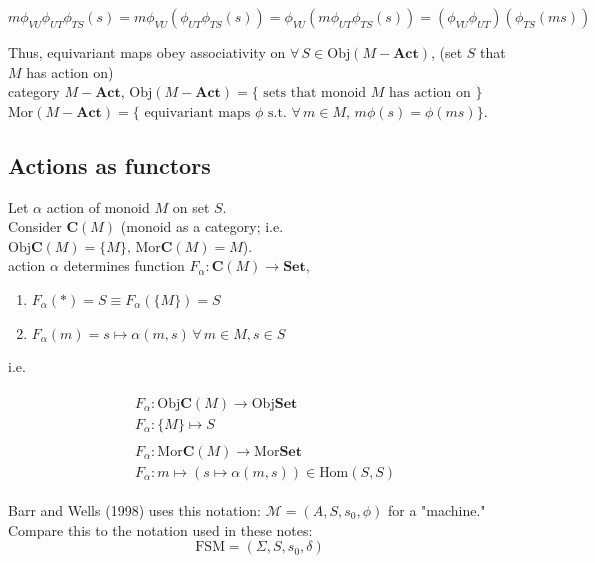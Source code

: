 \[
m \phi_{VU} \phi_{UT} \phi_{TS}(s) = m \phi_{VU} (\phi_{UT} \phi_{TS}(s)) = \phi_{VU} (m \phi_{UT} \phi_{TS}(s)) = (\phi_{VU} \phi_{UT}) (\phi_{TS}(ms))
\]

Thus, equivariant maps obey associativity on $\forall \, S \in \text{Obj}(M-\mathbf{Act})$, (set $S$ that $M$ has action on) \\
category $M-\mathbf{Act}$, $\text{Obj}(M-\mathbf{Act}) = \lbrace \text{ sets that monoid $M$ has action on }\rbrace$ \\
 $\text{Mor}(M-\mathbf{Act}) = \lbrace \text{ equivariant maps $\phi$ s.t. } \forall \, m \in M, \, m\phi(s) = \phi(ms) \rbrace$.

\subsection{Actions as functors}

Let $\alpha$ action of monoid $M$ on set $S$. \\

Consider $\mathbf{C}(M)$ (monoid as a category; i.e. $\text{Obj}\mathbf{C}(M) = \lbrace M \rbrace, \, \text{Mor}\mathbf{C}(M) = M$). \\
action $\alpha$ determines function $F_{\alpha} : \mathbf{C}(M) \to \mathbf{Set}$, 
\begin{enumerate}
	\item $F_{\alpha}(*) = S \equiv F_{\alpha}(\lbrace M \rbrace ) = S$
	\item  $F_{\alpha}(m) = s \mapsto \alpha(m, s) \, \forall \, m \in M, s \in S$
\end{enumerate}
i.e.

\[
\begin{gathered}
\begin{aligned}
& F_{\alpha} : \text{Obj}\mathbf{C}(M) \to \text{Obj}\mathbf{Set} \\ 
& F_{\alpha} : \lbrace M \rbrace \mapsto S 
\end{aligned} \\
\begin{aligned}
& F_{\alpha} : \text{Mor}\mathbf{C}(M) \to \text{Mor}\textbf{Set} \\ 
& F_{\alpha} : m \mapsto (s\mapsto \alpha(m,s)) \in \text{Hom}(S,S)
\end{aligned}
\end{gathered}
\]

Barr and Wells (1998) \cite{agat:BW1998} uses this notation: $\mathcal{M} = (A, S, s_0, \phi)$ for a "machine." Compare this to the notation used in these notes:
\[
\text{FSM} = (\Sigma, S, s_0, \delta)
\]

